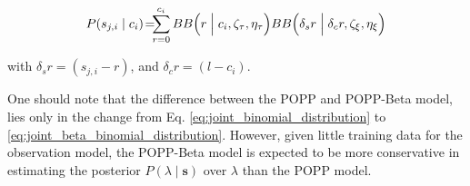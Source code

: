 \begin{equation}
	\label{eq:joint_beta_binomial_distribution}
    P(s_{j,i} \mid c_i) \! = \! \! \! \displaystyle\sum_{r = 0}^{c_{i}} \! \! ~ BB\Big(r \Bigm| c_i, \zeta_{\tau}, \eta_{\tau} \Big) BB\Big( \delta_s r \Bigm| \delta_c r, \zeta_{\xi}, \eta_{\xi} \Big)
\end{equation}

\noindent with $\delta_s r = (s_{j,i} - r)$, and $\delta_c r = (l - c_i)$.

One should note that the difference between the POPP and POPP-Beta model, lies only in the change from Eq. \ref{eq:joint_binomial_distribution} to \ref{eq:joint_beta_binomial_distribution}. However, given little training data for the observation model, the POPP-Beta model is expected to be more conservative in estimating the posterior $P(\lambda \mid \mathbf{s})$ over $\lambda$ than the POPP model. 

